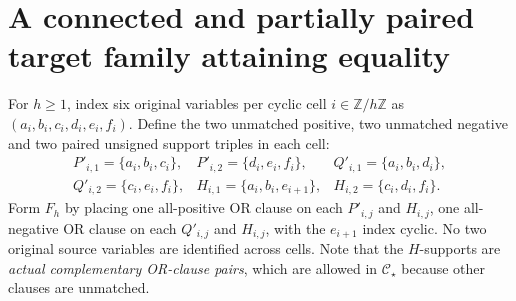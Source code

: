 \documentclass[11pt]{article}
\newcommand{\CS}{\mathcal C_\star}
\begin{document}
\section{A connected and partially paired target family attaining equality}
For \(h\ge1\), index six original variables per cyclic cell \(i\in\mathbb Z/h\mathbb Z\) as \((a_i,b_i,c_i,d_i,e_i,f_i)\). Define the two unmatched positive, two unmatched negative and two paired unsigned support triples in each cell:
\[
\begin{array}{lll}
P'_{i,1}=\{a_i,b_i,c_i\},&P'_{i,2}=\{d_i,e_i,f_i\},&
Q'_{i,1}=\{a_i,b_i,d_i\},\\
Q'_{i,2}=\{c_i,e_i,f_i\},&H_{i,1}=\{a_i,b_i,e_{i+1}\},&
H_{i,2}=\{c_i,d_i,f_i\}.
\end{array}
\]
Form \(F_h\) by placing one all-positive OR clause on each \(P'_{i,j}\) and \(H_{i,j}\), one all-negative OR clause on each \(Q'_{i,j}\) and \(H_{i,j}\), with the \(e_{i+1}\) index cyclic. No two original source variables are identified across cells. Note that the \(H\)-supports are \emph{actual complementary OR-clause pairs}, which are allowed in \(\CS\) because other clauses are unmatched.
\end{document}
